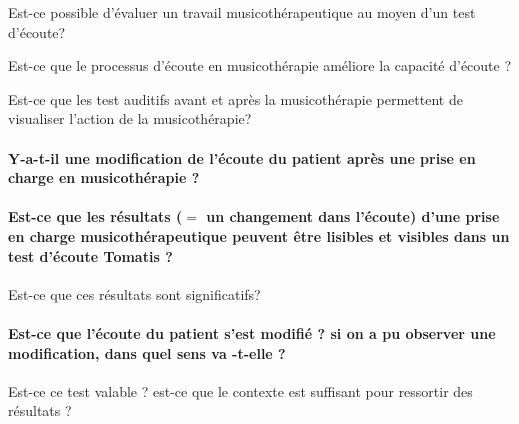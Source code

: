 Est-ce possible d'évaluer un travail musicothérapeutique au moyen
d'un test d'écoute?

Est-ce que le processus d'écoute en musicothérapie améliore la capacité
d'écoute ?

Est-ce que les test auditifs avant et après la musicothérapie permettent
de visualiser l'action de la musicothérapie?

\paragraph{Y-a-t-il une modification de l'écoute du patient après une prise
en charge en musicothérapie ?}

\paragraph{Est-ce que les résultats ($=$ un changement dans l'écoute) d'une prise
en charge musicothérapeutique peuvent être lisibles et visibles dans
un test d'écoute Tomatis ?}

Est-ce que ces résultats sont significatifs? 

\paragraph{Est-ce que l'écoute du patient s'est modifié ? si on a pu observer
une modification, dans quel sens va -t-elle ?}

Est-ce ce test valable ? est-ce que le contexte est suffisant pour
ressortir des résultats ?





